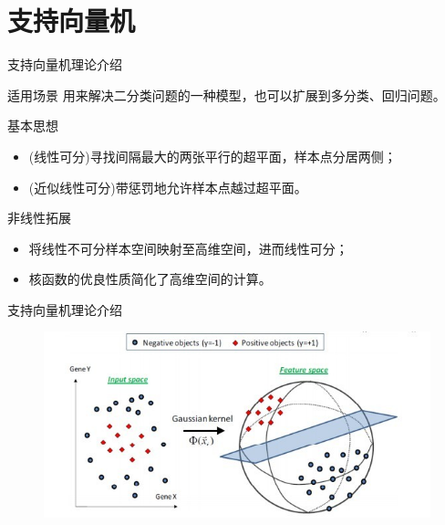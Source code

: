 \documentclass[11pt]{beamer}
\begin{document}
	\section{支持向量机}
	\begin{frame}{支持向量机}{理论介绍}
		\begin{block}{适用场景}
			用来解决二分类问题的一种模型，也可以扩展到多分类、回归问题。
		\end{block}
		\begin{block}{基本思想}
			\begin{itemize}
				\item (线性可分)寻找间隔最大的两张平行的超平面，样本点分居两侧；
				\item (近似线性可分)带惩罚地允许样本点越过超平面。
			\end{itemize}
		\end{block}
		\begin{block}{非线性拓展}
			\begin{itemize}
				\item 将线性不可分样本空间映射至高维空间，进而线性可分；
				\item 核函数的优良性质简化了高维空间的计算。
			\end{itemize}
		\end{block}
	\end{frame}
	\begin{frame}{支持向量机}{理论介绍}
		\begin{figure}[h]
			\centering
			\includegraphics[width=\linewidth]{img/线性不可分到线性可分}
		\end{figure}
	\end{frame}
\end{document}

